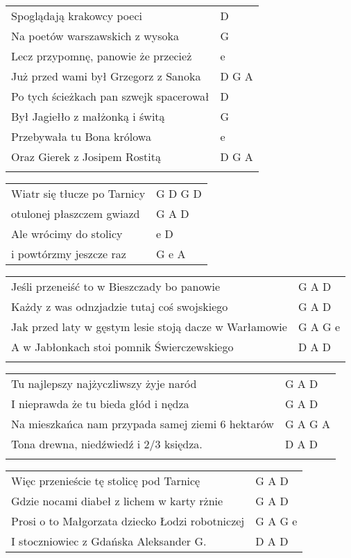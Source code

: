 \documentclass[a5paper]{article}
\begin{document}
\noindent
\begin{tabular}{@{}p{9.5cm}p{3cm}@{}}
Spoglądają krakowcy poeci & D \\
Na poetów warszawskich z wysoka & G \\
Lecz przypomnę, panowie że przecież & e \\
Już przed wami był Grzegorz z Sanoka & D G A \\
Po tych ścieżkach pan szwejk spacerował & D \\
Był Jagiełło z małżonką i świtą & G \\
Przebywała tu Bona królowa & e \\
Oraz Gierek z Josipem Rostitą & D G A \\ \\
\end{tabular}

\noindent
\begin{tabular}{@{}p{9.5cm}p{3cm}@{}}
Wiatr się tłucze po Tarnicy & G D G D \\
otulonej płaszczem gwiazd & G A D \\
Ale wrócimy do stolicy & e D \\
i powtórzmy jeszcze raz & G e A \\
\end{tabular}

\noindent
\begin{tabular}{@{}p{8.5cm}p{3cm}@{}}
Jeśli przeneiść to w Bieszczady bo panowie & G A D \\
Każdy z was odnzjadzie tutaj coś swojskiego & G A D \\
Jak przed laty w gęstym lesie stoją dacze w Warłamowie & G A G e \\
A w Jabłonkach stoi pomnik Świerczewskiego & D A D \\ \\
\end{tabular}

\noindent
\begin{tabular}{@{}p{8.5cm}p{3cm}@{}}
Tu najlepszy najżyczliwszy żyje naród & G A D \\
I nieprawda że tu bieda głód i nędza & G A D \\
Na mieszkańca nam przypada samej ziemi 6 hektarów & G A G A \\
Tona drewna, niedźwiedź i 2/3 księdza. & D A D \\ \\
\end{tabular}

\noindent
\begin{tabular}{@{}p{9.5cm}p{3cm}@{}}
Więc przenieście tę stolicę pod Tarnicę & G A D \\
Gdzie nocami diabeł z lichem w karty rżnie & G A D \\
Prosi o to Małgorzata dziecko Łodzi robotniczej & G A G e \\
I stoczniowiec z Gdańska Aleksander G. & D A D
\end{tabular}
\end{document}
